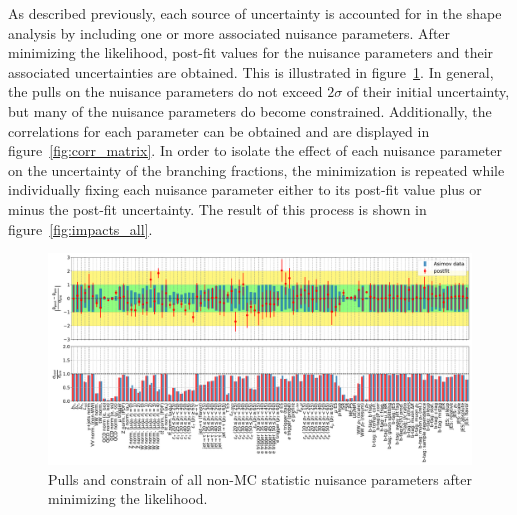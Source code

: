 As described previously, each source of uncertainty is accounted for in
the shape analysis by including one or more associated nuisance
parameters.  After minimizing the likelihood, post-fit values for the
nuisance parameters and their associated uncertainties are obtained.
This is illustrated in figure~\ref{fig:pulls_all}.  In general, the
pulls on the nuisance parameters do not exceed $2\sigma$ of their
initial uncertainty, but many of the nuisance parameters do become
constrained.  Additionally, the correlations for each parameter can be
obtained and are displayed in figure~\ref{fig:corr_matrix}.  In order to
isolate the effect of each nuisance parameter on the uncertainty of the 
branching fractions, the minimization is repeated while individually fixing each
nuisance parameter either to its post-fit value plus or minus the
post-fit uncertainty.  The result of this process is shown in
figure~\ref{fig:impacts_all}.

\begin{figure}[ht]
    \centering
    \includegraphics[width=1.2\textwidth, angle=-90]{chapters/Analysis/sectionSystematics/figures/asimov_pulls_summary.pdf}
    \caption{Pulls and constrain of all non-MC statistic nuisance
        parameters after minimizing the likelihood.}
    \label{fig:pulls_all}
\end{figure}

